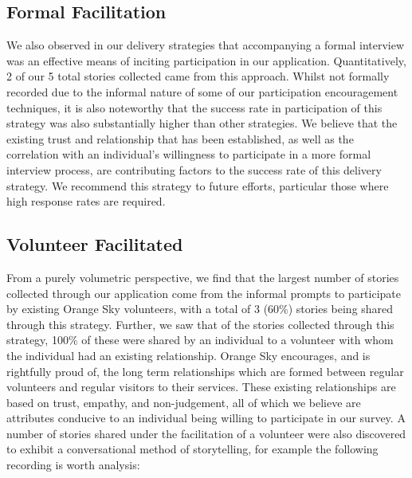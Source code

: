 \subsection{Formal Facilitation}

We also observed in our delivery strategies that accompanying a formal interview was an effective means of inciting participation in our application. Quantitatively, 2 of our 5 total stories collected came from this approach. Whilst not formally recorded due to the informal nature of some of our participation encouragement techniques, it is also noteworthy that the success rate in participation of this strategy was also substantially higher than other strategies. We believe that the existing trust and relationship that has been established, as well as the correlation with an individual's willingness to participate in a more formal interview process, are contributing factors to the success rate of this delivery strategy. We recommend this strategy to future efforts, particular those where high response rates are required.

\subsection{Volunteer Facilitated}

From a purely volumetric perspective, we find that the largest number of stories collected through our application come from the informal prompts to participate by existing Orange Sky volunteers, with a total of 3 (60\%) stories being shared through this strategy. Further, we saw that of the stories collected through this strategy, 100\% of these were shared by an individual to a volunteer with whom the individual had an existing relationship. Orange Sky encourages, and is rightfully proud of, the long term relationships which are formed between regular volunteers and regular visitors to their services. These existing relationships are based on trust, empathy, and non-judgement, all of which we believe are attributes conducive to an individual being willing to participate in our survey. A number of stories shared under the facilitation of a volunteer were also discovered to exhibit a conversational method of storytelling, for example the following recording is worth analysis:

